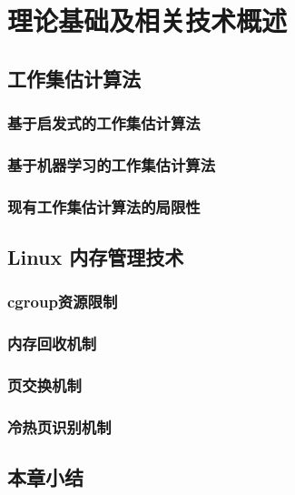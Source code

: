 \chapter{理论基础及相关技术概述}

\section{工作集估计算法}

\subsection{基于启发式的工作集估计算法}

\subsection{基于机器学习的工作集估计算法}

\subsection{现有工作集估计算法的局限性}

\section{Linux 内存管理技术}

\subsection{cgroup资源限制}

\subsection{内存回收机制}

\subsection{页交换机制}

\subsection{冷热页识别机制}

\section{本章小结}